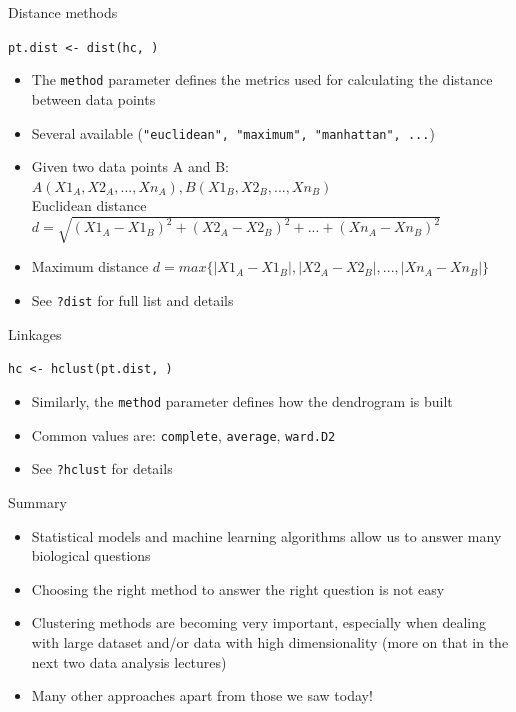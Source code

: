 \documentclass[9pt]{beamer}
\begin{document}
\begin{frame}
{Distance methods}
\begin{codebox}
\texttt{pt.dist  <- dist(hc, )}
\end{codebox}

\begin{itemize}
\item The \texttt{method} parameter defines the metrics used for calculating the distance between data points
\item Several available (\texttt{"euclidean", "maximum", "manhattan", ...})
\pause
\item Given two data points A and B: $A(X1_A, X2_A, ..., Xn_A), B(X1_B, X2_B, ..., Xn_B)$\\
Euclidean distance $d = \sqrt{(X1_A-X1_B)^2+(X2_A-X2_B)^2+...+(Xn_A-Xn_B)^2}$
\pause
\item Maximum distance $d = max\{|X1_A-X1_B|, |X2_A-X2_B|, ..., |Xn_A-Xn_B|\}$
\pause
\item See \texttt{?dist} for full list and details
\end{itemize}
\end{frame}

\begin{frame}
{Linkages}
\begin{codebox}
\texttt{hc <- hclust(pt.dist, )}
\end{codebox}
\begin{itemize}
\item Similarly, the \texttt{method} parameter defines how the dendrogram is built
\item Common values are: \texttt{complete}, \texttt{average}, \texttt{ward.D2}
\item See \texttt{?hclust} for details

\end{itemize}
\end{frame}

\begin{frame}
{Summary}
\begin{itemize}
\item Statistical models and machine learning algorithms allow us to answer many biological questions
\item Choosing the right method to answer the right question is not easy
\item Clustering methods are becoming very important, especially when dealing with large dataset and/or data with high dimensionality (more on that in the next two data analysis lectures)
\item Many other approaches apart from those we saw today!
\end{itemize}
\end{frame}
\end{document}
